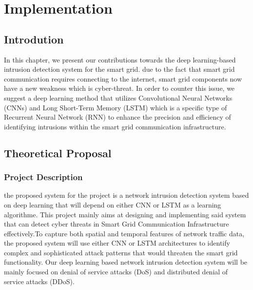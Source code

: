 




\chapter{Implementation} \label{chap:Implementation}
\section*{Introdution}


In this chapter, we present our contributions towards the deep learning-based intrusion detection system for the smart grid. due to the fact that smart grid communication requires connecting to the internet, smart grid components now have a new weakness which is cyber-threat. In order to counter this issue, we suggest a deep learning method that utilizes Convolutional Neural Networks (CNNs) and Long Short-Term Memory (LSTM) which is a specific type of Recurrent Neural Network (RNN) to enhance the precision and efficiency of identifying intrusions within the smart grid communication infrastructure.





\section{Theoretical Proposal}

\subsection{Project Description}
the proposed system for the project is a network intrusion detection system based on deep learning that will depend on either CNN or LSTM as a learning algorithme. This project mainly aims at designing and implementing said system that can detect cyber threats in Smart Grid Communication Infrastructure effectively.To capture both spatial and temporal features of network traffic data, the proposed system will use either CNN or LSTM architectures to identify complex and sophisticated attack patterns that would threaten the smart grid functionality.
Our deep learning based network intrusion detection system will be mainly focused on denial of service attacks (DoS) and distributed denial of service attacks (DDoS).

